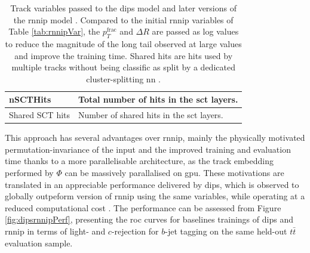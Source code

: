 \begin{table}[h]
\begin{center}
\begin{tabular}{C{3cm}|C{13cm}}
          nSCTHits          & Total number of hits in the \gls{sct} layers. \\ \hline
          Shared SCT hits   & Number of shared hits in the \gls{sct} layers.\\ \hline \hline
      \end{tabular}
      \caption{Track variables passed to the \gls{dips} model and later versions of the \gls{rnnip} model \cite{ATL-PHYS-PUB-2020-014}. Compared to the initial \gls{rnnip} variables of Table \ref{tab:rnnipVar}, the $p_T^{\textrm{frac}}$ and $\Delta R$ are passed as log values to reduce the magnitude of the long tail observed at large values and improve the training time. Shared hits are hits used by multiple tracks without being classific as split by a dedicated cluster-splitting \gls{nn} \cite{ATLAS-tracks-algo}.}
    \label{tab:dipsVar}
  \end{center}
\end{table}

This approach has several advantages over \gls{rnnip}, mainly the physically motivated permutation-invariance of the input and the improved training and evaluation time thanks to a more parallelisable architecture, as the track embedding performed by $\Phi$ can be massively parallalised on \gls{gpu}. These motivations are translated in an appreciable performance delivered by \gls{dips}, which is observed to globally outpeform version of \gls{rnnip} using the same variables, while operating at a reduced computational cost \cite{ATL-PHYS-PUB-2020-014}. The performance can be assessed from Figure \ref{fig:dipsrnnipPerf}, presenting the \gls{roc} curves for baselines trainings of \gls{dips} and \gls{rnnip} in terms of light- and $c$-rejection for $b$-jet tagging on the same held-out $t\bar{t}$ evaluation sample.

